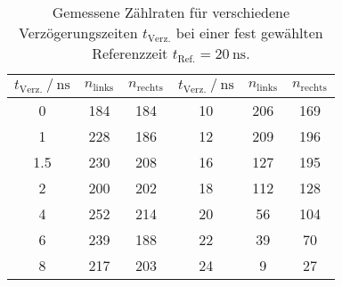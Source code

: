 \begin{table}
\centering
\caption{Gemessene Zählraten für verschiedene Verzögerungszeiten $t_\text{Verz.}$ bei einer fest gewählten
Referenzzeit $t_\text{Ref.} = \SI{20}{\nano\second}$.}
\begin{tabular}{c c c | c c c}
\toprule
\multicolumn{1}{c}{$t_\text{Verz.} \:/\: \si{\nano\second}$} & \multicolumn{1}{c}{$n_\text{links}$}
& \multicolumn{1}{c}{$n_\text{rechts}$} & \multicolumn{1}{c}{$t_\text{Verz.} \:/\: \si{\nano\second}$}
& \multicolumn{1}{c}{$n_\text{links}$} & \multicolumn{1}{c}{$n_\text{rechts}$}  \\
\midrule
0   & 184 & 184 & 10 & 206 & 169 \\
1   & 228 & 186 & 12 & 209 & 196 \\
1.5 & 230 & 208 & 16 & 127 & 195 \\
2   & 200 & 202 & 18 & 112 & 128 \\
4   & 252 & 214 & 20 & 56  & 104 \\
6   & 239 & 188 & 22 & 39  & 70  \\
8   & 217 & 203 & 24 & 9   & 27  \\
\bottomrule
\end{tabular}
\label{tabular_02}
\end{table}
